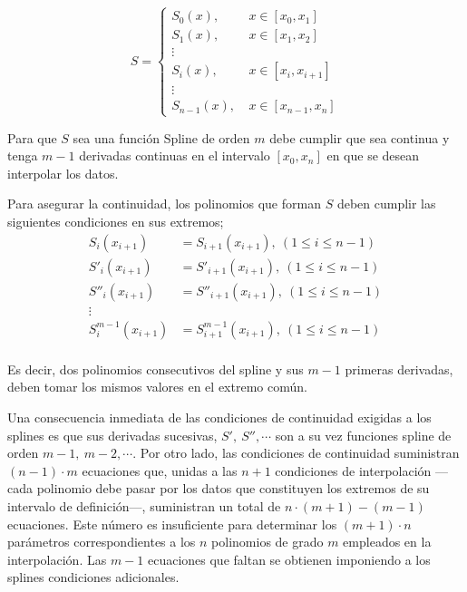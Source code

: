 \begin{equation*}
S= \left\{ 
\begin{aligned}
S_0(x),& \ x\in [x_0,x_1]\\
S_1(x),& \ x\in [x_1,x_2]\\
\vdots \\
S_i(x),& \ x\in [x_i,x_{i+1}]\\
\vdots \\
S_{n-1}(x),& \ x\in [x_{n-1},x_n]
\end{aligned}
\right.
\end{equation*}

Para que $S$ sea una función Spline de orden $m$ debe cumplir que sea continua y tenga $m-1$ derivadas continuas en el intervalo $[x_0,x_n]$ en que se desean interpolar los datos.
   
Para asegurar la continuidad, los polinomios que forman $S$ deben cumplir las siguientes condiciones en sus extremos;
\begin{align*}
S_i(x_{i+1})&=S_{i+1}(x_{i+1}),\ (1\leq i \leq n-1)\\
S'_i(x_{i+1})&=S'_{i+1}(x_{i+1}),\ (1\leq i \leq n-1)\\
S''_i(x_{i+1})&=S''_{i+1}(x_{i+1}),\ (1\leq i \leq n-1)\\
\vdots \\
S^{m-1}_i(x_{i+1})&=S^{m-1}_{i+1}(x_{i+1}),\ (1\leq i \leq n-1)\\
\end{align*}

Es decir, dos polinomios consecutivos del spline y sus $m-1$ primeras derivadas, deben tomar los mismos valores en el extremo común. 

Una consecuencia inmediata de las condiciones de continuidad exigidas a los splines es que sus derivadas sucesivas, $S',\ S'', \cdots$ son a su vez funciones spline de orden $m-1,\ m-2, \cdots$. Por otro lado, las condiciones de continuidad suministran  $(n-1)\cdot m$ ecuaciones que, unidas a las $n+1$ condiciones de interpolación ---cada polinomio debe pasar por los datos que constituyen los extremos de su intervalo de definición---,  suministran un total de  $n\cdot (m+1)-(m-1)$ ecuaciones. Este número es insuficiente para determinar los $(m+1)\cdot n$ parámetros correspondientes a los $n$ polinomios de grado $m$ empleados en la interpolación. Las $m-1$ ecuaciones que faltan se obtienen imponiendo a los splines condiciones adicionales.


